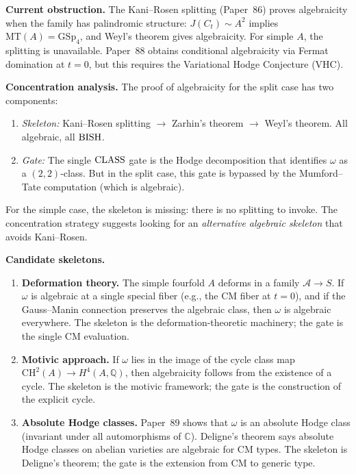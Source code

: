 \documentclass[11pt,a4paper]{article}
\theoremstyle{plain}
\theoremstyle{definition}
\newcommand{\BISH}{\textup{BISH}}
\newcommand{\CLASS}{\textup{CLASS}}
\newcommand{\Q}{\mathbb{Q}}
\newcommand{\C}{\mathbb{C}}
\begin{document}
\medskip
\noindent\textbf{Current obstruction.}
The Kani--Rosen splitting (Paper~86) proves algebraicity when the
family has palindromic structure: $J(C_t) \sim A^2$ implies
$\mathrm{MT}(A) = \mathrm{GSp}_4$, and Weyl's theorem gives
algebraicity.  For simple $A$, the splitting is unavailable.
Paper~88 obtains conditional algebraicity via Fermat domination
at $t = 0$, but this requires the Variational Hodge Conjecture (VHC).

\medskip
\noindent\textbf{Concentration analysis.}
The proof of algebraicity for the split case has two components:
\begin{enumerate}[nosep,label=(\roman*)]
\item \emph{Skeleton:} Kani--Rosen splitting $\to$ Zarhin's theorem
  $\to$ Weyl's theorem.  All algebraic, all $\BISH$.
\item \emph{Gate:} The single $\CLASS$ gate is the Hodge decomposition
  that identifies $\omega$ as a $(2,2)$-class.  But in the split case,
  this gate is bypassed by the Mumford--Tate computation (which is
  algebraic).
\end{enumerate}

For the simple case, the skeleton is missing: there is no splitting
to invoke.  The concentration strategy suggests looking for an
\emph{alternative algebraic skeleton} that avoids Kani--Rosen.

\medskip
\noindent\textbf{Candidate skeletons.}
\begin{enumerate}[nosep]
\item \textbf{Deformation theory.}  The simple fourfold $A$ deforms
  in a family $\mathcal{A} \to S$.  If $\omega$ is algebraic at a
  single special fiber (e.g., the CM fiber at $t = 0$), and if the
  Gauss--Manin connection preserves the algebraic class, then $\omega$
  is algebraic everywhere.  The skeleton is the deformation-theoretic
  machinery; the gate is the single CM evaluation.
\item \textbf{Motivic approach.}  If $\omega$ lies in the image of
  the cycle class map $\mathrm{CH}^2(A) \to H^4(A, \Q)$, then
  algebraicity follows from the existence of a cycle.  The skeleton
  is the motivic framework; the gate is the construction of the
  explicit cycle.
\item \textbf{Absolute Hodge classes.}  Paper~89 shows that $\omega$
  is an absolute Hodge class (invariant under all automorphisms of
  $\C$).  Deligne's theorem says absolute Hodge classes on abelian
  varieties are algebraic for CM types.  The skeleton is Deligne's
  theorem; the gate is the extension from CM to generic type.
\end{enumerate}
\end{document}
